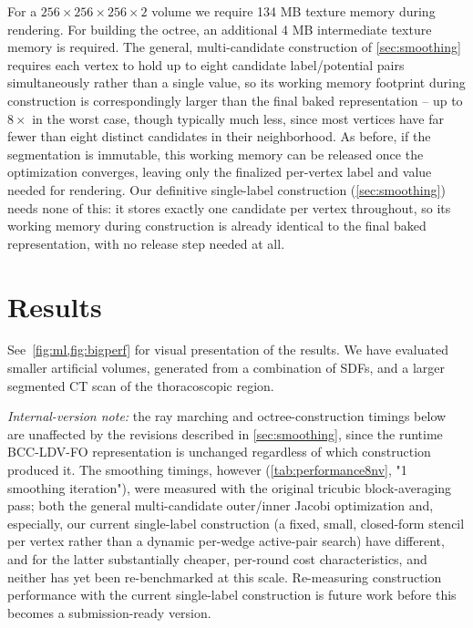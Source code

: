 \documentclass[journal]{vgtc}                     %
\begin{document}
For a $256 \times 256 \times 256 \times 2$ volume we require 134 MB texture memory during rendering. For building the octree, an additional 4 MB intermediate texture memory is required. The general, multi-candidate construction of \cref{sec:smoothing} requires each vertex to hold up to eight candidate label/potential pairs simultaneously rather than a single value, so its working memory footprint during construction is correspondingly larger than the final baked representation -- up to $8\times$ in the worst case, though typically much less, since most vertices have far fewer than eight distinct candidates in their neighborhood. As before, if the segmentation is immutable, this working memory can be released once the optimization converges, leaving only the finalized per-vertex label and value needed for rendering. Our definitive single-label construction (\cref{sec:smoothing}) needs none of this: it stores exactly one candidate per vertex throughout, so its working memory during construction is already identical to the final baked representation, with no release step needed at all.

\section{Results}
See~\cref{fig:ml,fig:bigperf} for visual presentation of the results. We have evaluated smaller artificial volumes, generated from a combination of SDFs, and a larger segmented CT scan of the thoracoscopic region.

\emph{Internal-version note:} the ray marching and octree-construction timings below are unaffected by the revisions described in \cref{sec:smoothing}, since the runtime BCC-LDV-FO representation is unchanged regardless of which construction produced it. The smoothing timings, however (\cref{tab:performance8nv}, "1 smoothing iteration"), were measured with the original tricubic block-averaging pass; both the general multi-candidate outer/inner Jacobi optimization and, especially, our current single-label construction (a fixed, small, closed-form stencil per vertex rather than a dynamic per-wedge active-pair search) have different, and for the latter substantially cheaper, per-round cost characteristics, and neither has yet been re-benchmarked at this scale. Re-measuring construction performance with the current single-label construction is future work before this becomes a submission-ready version.
\end{document}

